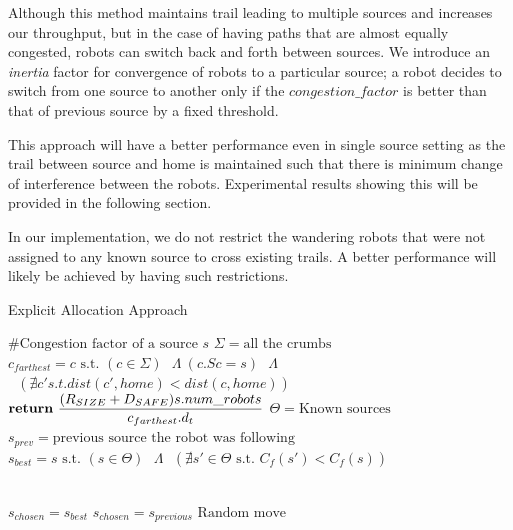 \documentclass[letterpaper, 10 pt, conference]{ieeeconf}  %
\begin{document}
Although this method maintains trail leading to multiple sources and increases our throughput, but in the case of having paths that are almost equally congested, robots can switch back and forth between sources. We introduce an \emph{inertia} factor for convergence of robots to a particular source; a robot decides to switch from one source to another only if the $congestion\_factor$ is better than that of previous source by a fixed threshold.

This approach will have a better performance even in single source setting as the trail between source and home is maintained such that there is minimum change of interference between the robots. Experimental results showing this will be provided in the following section. 

In our implementation, we do not restrict the wandering robots that were not assigned to any known source to cross existing trails. A better performance will likely be achieved by having such restrictions.

\begin{algorithm}
\caption{Explicit Allocation Approach}\label{algorithm:2}
\begin{algorithmic}
\State $\text{\# Congestion factor of a source } s$
  \State $\Sigma = \text{all the crumbs}$
  \State $c_{farthest} =  c \text{ s.t. } (c \in \Sigma) \text{ } \Lambda \ (c.Sc=s) \text{ } \Lambda$
  \State  $\text{                                                 }(\nexists c' { s.t. } dist(c', home) < dist(c, home))$
  \\
  \State $\bold{return} \text{ } \dfrac{(R_{SIZE} + D_{SAFE})  s.num\_robots}{ c_{farthest}.d_t }$
\EndProcedure
\State $\Theta = \text{Known sources}$
\State $s_{prev} = \text{previous source the robot was following}$
\State $s_{best} = s \text{ s.t. } (s \in \Theta) \text{ } \Lambda \text{ } (\nexists s' \in \Theta \text{ s.t. } C_f(s') < C_f(s))$

\\
     \State $s_{chosen} = s_{best}$
  \Else
     \State $s_{chosen} = s_{previous}$
  \EndIf
\Else
   \State $\text{Random move}$
\EndIf

\end{algorithmic}
\end{algorithm}
\end{document}
